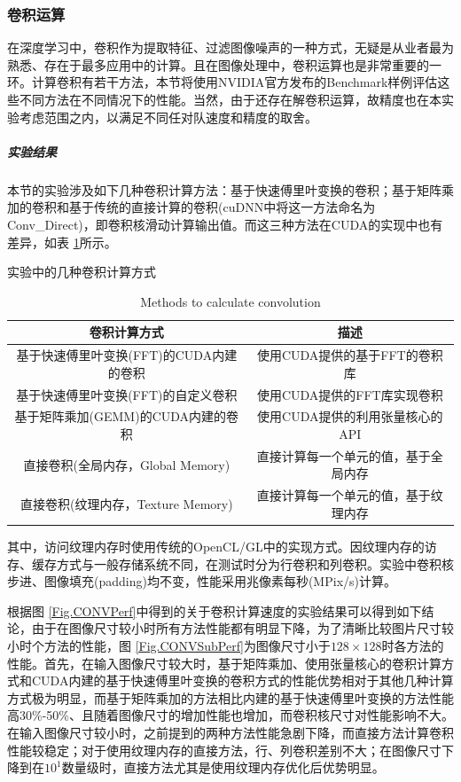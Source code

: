\subsubsection{卷积运算}
\par 在深度学习中，卷积作为提取特征、过滤图像噪声的一种方式，无疑是从业者最为熟悉、存在于最多应用中的计算。且在图像处理中，卷积运算也是非常重要的一环。计算卷积有若干方法，本节将使用NVIDIA官方发布的Benchmark样例评估这些不同方法在不同情况下的性能。当然，由于还存在解卷积运算，故精度也在本实验考虑范围之内，以满足不同任对队速度和精度的取舍。
\subparagraph{实验结果}
\par 本节的实验涉及如下几种卷积计算方法：基于快速傅里叶变换的卷积；基于矩阵乘加的卷积和基于传统的直接计算的卷积(cuDNN中将这一方法命名为Conv\_Direct)，即卷积核滑动计算输出值。而这三种方法在CUDA的实现中也有差异，如表 \ref{table-CONV}所示。
\begin{table}
	\centering
	\renewcommand{\thetable}{\arabic{section}-\arabic{table} }
	\renewcommand{\tablename}{表}
	\caption{实验中的几种卷积计算方式}
	\addtocounter{table}{-1}
	\renewcommand{\thetable}{\arabic{section}-\arabic{table} }
	\renewcommand{\tablename}{Table}
	\caption{Methods to calculate convolution}
	\begin{tabular}{cc}
		\toprule
		卷积计算方式	&	描述\\
		\midrule
		基于快速傅里叶变换(FFT)的CUDA内建的卷积 & 使用CUDA提供的基于FFT的卷积库\\
		基于快速傅里叶变换(FFT)的自定义卷积 & 使用CUDA提供的FFT库实现卷积\\
		基于矩阵乘加(GEMM)的CUDA内建的卷积 & 使用CUDA提供的利用张量核心的API\\
		直接卷积(全局内存，Global Memory) & 直接计算每一个单元的值，基于全局内存\\
		直接卷积(纹理内存，Texture Memory) & 直接计算每一个单元的值，基于纹理内存\\
		\bottomrule
	\end{tabular} \label{table-CONV} 
\end{table}
\par 其中，访问纹理内存时使用传统的OpenCL/GL中的实现方式。因纹理内存的访存、缓存方式与一般存储系统不同，在测试时分为行卷积和列卷积。实验中卷积核步进、图像填充(padding)均不变，性能采用兆像素每秒(MPix/s)计算。
\par 根据图 \ref{Fig.CONVPerf}中得到的关于卷积计算速度的实验结果可以得到如下结论，由于在图像尺寸较小时所有方法性能都有明显下降，为了清晰比较图片尺寸较小时个方法的性能，图 \ref{Fig.CONVSubPerf}为图像尺寸小于$ 128\times 128 $时各方法的性能。首先，在输入图像尺寸较大时，基于矩阵乘加、使用张量核心的卷积计算方式和CUDA内建的基于快速傅里叶变换的卷积方式的性能优势相对于其他几种计算方式极为明显，而基于矩阵乘加的方法相比内建的基于快速傅里叶变换的方法性能高30\%-50\%、且随着图像尺寸的增加性能也增加，而卷积核尺寸对性能影响不大。在输入图像尺寸较小时，之前提到的两种方法性能急剧下降，而直接方法计算卷积性能较稳定；对于使用纹理内存的直接方法，行、列卷积差别不大；在图像尺寸下降到在$ 10^1 $数量级时，直接方法尤其是使用纹理内存优化后优势明显。
